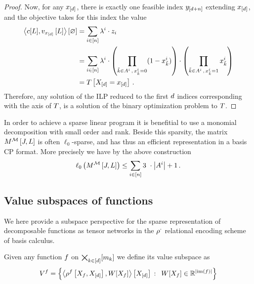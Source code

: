 \begin{proof}
	Now, for any $x_{[d]}$, there is exactly one feasible index $y_{[d+n]}$ extending $x_{[d]}$, and the objective takes for this index the value 
	\begin{align}
	 	 \left\langle c[L], v_{x_{[d]}}\left[L\right]\right\rangle \left[ \varnothing \right] 
		 &= \sum_{i\in[n]} \lambda^{i} \cdot z_{i} \\
		 &= \sum_{i\in[n]} \lambda^{i} \cdot \left( \prod_{\tilde{k}\in A^{i} \, , \,  x_{\tilde{k}}^i = 0} (1 - x_{\tilde{k}}^i) \right)
		\cdot \left( \prod_{\tilde{k}\in A^{i} \, , \,  x_{\tilde{k}}^i = 1}  x_{\tilde{k}}^i \right)  \\
		& = T\left[X_{[d]}=x_{[d]}\right] \, . 
	 \end{align}
	 Therefore, any solution of the ILP reduced to the first $d$ indices corresponding with the axis of $T$, is a solution of the binary optimization problem to $T$.
\end{proof}



In order to achieve a sparse linear program it is benefitial to use a monomial decomposition with small order and rank.
Beside this sparsity, the matrix $M^{\mathcal{M}}\left[J,L\right]$ is often $\ell_0$-sparse, and has thus an efficient representation in a basis CP format.
More precisely we have by the above construction 
\begin{align*}
	\sparsityof{\matrixofat{\sliceset}{\datvariable,\selvariable}} \leq \sum_{\decindexin} 3 \cdot \cardof{\variablesetof{\decindex}} +1 \, . 
\end{align*}


\subsection{Value subspaces of functions}\label{sec:HT}


We here provide a subspace perspective for the sparse representation of decomposable functions as tensor networks in the $\rho^{\cdot}$ relational encoding scheme of basis calculus.

\begin{definition}
	Given any function $f$ on $\bigtimes_{k\in[d]}[m_{k}]$ we define its value subspace as 
		\[ \subspaceof{\exfunction} = \left\{\sbcontractionof{\rencodingofat{\exfunction}{\catvariableof{\exfunction},\shortcatvariables},W[\catvariableof{\exfunction}]}{\shortcatvariables} \, : \, W[\catvariableof{\exfunction}] \in \rr^{\cardof{\imageof{\exfunction}}} \right\} \]
\end{definition}

